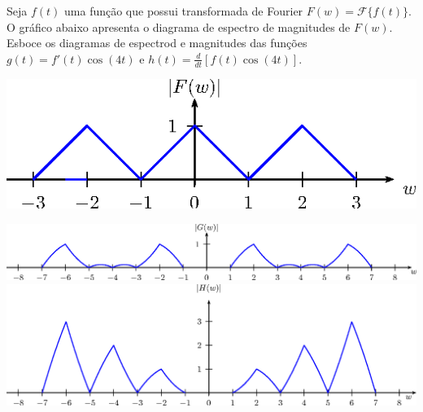 \begin{exer} Seja $f(t)$ uma função que possui transformada de Fourier $F(w)=\mathcal{F}\{f(t)\}$. O gráfico abaixo apresenta o diagrama de espectro de magnitudes de $F(w)$. Esboce os diagramas de espectrod e magnitudes das funções $g(t)=f'(t)\cos(4t)$ e $h(t)=\frac{d}{dt}\left[f(t)\cos(4t)\right]$.

    \begin{center}
        \includegraphics{cap_propriedades_transformada/pics/diagrama_7A}
    \end{center}
\end{exer}

\begin{resp}
    \begin{center}
    \includegraphics{cap_propriedades_transformada/pics/diagrama_7A_resp_1}\\
    \includegraphics{cap_propriedades_transformada/pics/diagrama_7A_resp_2}
    \end{center}
\end{resp}
           
    

